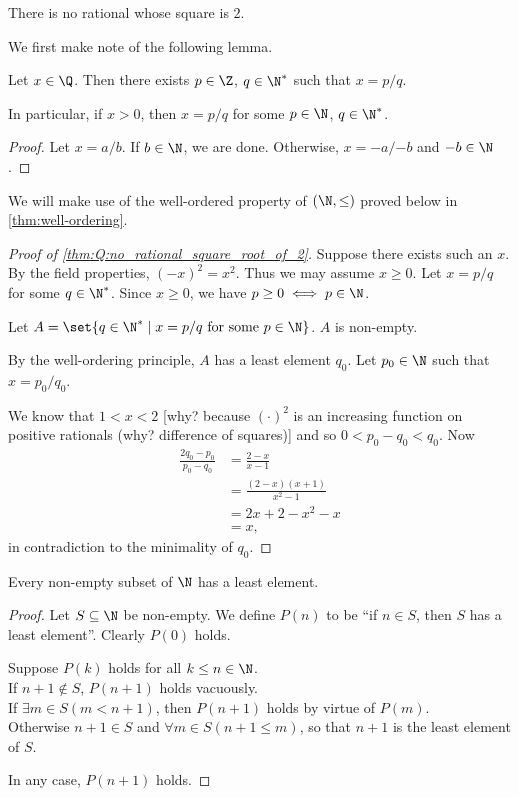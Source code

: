\begin{theorem*} \label{thm:Q:no_rational_square_root_of_2}
    There is no rational whose square is $2$.
\end{theorem*}
We first make note of the following lemma.
\begin{lemma} \label{thm:positive_denominator}
    Let $x \in \Q$.
    Then there exists $p \in \Z$, $q \in \N^*$ such that $x = p/q$.

    In particular, if $x > 0$, then $x = p/q$ for some $p \in \N$, $q \in \N^*$.
\end{lemma}
\begin{proof}
    Let $x = a/b$.
    If $b \in \N$, we are done.
    Otherwise, $x = -a/{-b}$ and $-b \in \N$. %
\end{proof}
We will make use of the well-ordered property of $(\N, \le)$ proved below in
\cref{thm:well-ordering}.
\begin{proof}[Proof of \cref{thm:Q:no_rational_square_root_of_2}]
    Suppose there exists such an $x$.
    By the field properties, $(-x)^2 = x^2$.
    Thus we may assume $x \ge 0$.
    Let $x = p/q$ for some $q \in \N^*$.
    Since $x \ge 0$, we have $p \ge 0 \iff p \in \N$.

    Let $A = \set{q \in \N^* \mid x = p/q \text{ for some } p \in \N}$.
    $A$ is non-empty.

    By the well-ordering principle, $A$ has a least element $q_0$.
    Let $p_0 \in \N$ such that $x = p_0/q_0$.

    We know that $1 < x < 2$ [why? because $(\cdot)^2$ is an increasing function
    on positive rationals (why? difference of squares)] and so $0 < p_0-q_0 < q_0$.
    Now \begin{align*}
        \frac{2q_0 - p_0}{p_0 - q_0}
            &= \frac{2 - x}{x - 1} \\
            &= \frac{(2 - x)(x + 1)}{x^2 - 1} \\
            &= 2x + 2 - x^2 - x \\
            &= x,
    \end{align*}
    in contradiction to the minimality of $q_0$.
\end{proof}

\begin{theorem*} \label{thm:well-ordering}
    Every non-empty subset of $\N$ has a least element.
\end{theorem*}
\begin{proof}
    Let $S \subseteq \N$ be non-empty.
    We define $P(n)$ to be ``if $n \in S$, then $S$ has a least element''.
    Clearly $P(0)$ holds.

    Suppose $P(k)$ holds for all $k \le n \in \N$. \\
    If $n+1 \notin S$, $P(n+1)$ holds vacuously. \\
    If $\exists m \in S (m < n+1)$, then $P(n+1)$ holds by virtue of $P(m)$. \\
    Otherwise $n+1 \in S$ and $\forall m \in S (n+1 \le m)$, so that $n+1$ is
    the least element of $S$.

    In any case, $P(n+1)$ holds.
\end{proof}

